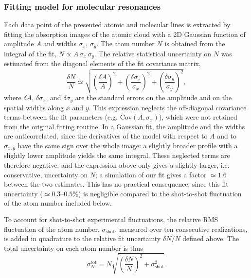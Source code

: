 \subsubsection{Fitting model for molecular resonances}
\label{sec:fitting_model}

Each data point of the presented atomic and molecular lines is extracted by fitting the
absorption images of the atomic cloud with a 2D Gaussian function of amplitude $A$ and widths $\sigma_x$, $\sigma_y$.
The atom number $N$
is obtained from the integral of the fit, $N \propto A\,\sigma_x\,\sigma_y$. The relative
statistical uncertainty on $N$ was estimated from the diagonal elements of the fit
covariance matrix,
\begin{equation}
\frac{\delta N}{N} \simeq \sqrt{\left(\frac{\delta A}{A}\right)^2 + \left(\frac{\delta \sigma_x}{\sigma_x}\right)^2 + \left(\frac{\delta \sigma_y}{\sigma_y}\right)^2},
\end{equation}
where $\delta A$, $\delta \sigma_x$, and $\delta \sigma_y$ are the standard errors on the
amplitude and on the spatial widths along $x$ and $y$. This expression neglects the
off-diagonal covariance terms between the fit parameters (e.g.
$\text{Cov}(A,\sigma_x)$), which were not retained from the original fitting routine. In a
Gaussian fit, the amplitude and the widths are anticorrelated, since the derivatives of
the model with respect to $A$ and to $\sigma_{x,y}$ have the same sign over the whole image:
a slightly broader profile with a slightly lower amplitude yields the same integral. These
neglected terms are therefore negative, and the expression above only gives a slightly
larger, i.e. conservative, uncertainty on $N$; a simulation of our fit gives a factor
$\simeq1.6$ between the two estimates. This has no practical consequence, since this fit
uncertainty ($\simeq0.3$--$0.5\%$) is negligible compared to the shot-to-shot fluctuation of the
atom number included below.

To account for shot-to-shot experimental fluctuations, the relative RMS fluctuation of the
atom number, $\sigma_{\text{shot}}$, measured over ten consecutive realizations, is added in
quadrature to the relative fit uncertainty $\delta N/N$ defined above. The total uncertainty
on each atom number is thus
\begin{equation}
\sigma_N^{\text{tot}} = N \sqrt{\left(\frac{\delta N}{N}\right)^2 + \sigma_{\text{shot}}^2}.
\end{equation}

